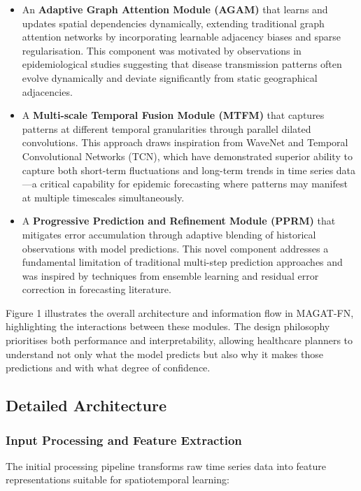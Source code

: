 \documentclass[lettersize, journal]{IEEEtran}
\begin{document}
\begin{itemize}
    \item An \textbf{Adaptive Graph Attention Module (AGAM)} that learns and updates spatial dependencies dynamically, extending traditional graph attention networks by incorporating learnable adjacency biases and sparse regularisation. This component was motivated by observations in epidemiological studies suggesting that disease transmission patterns often evolve dynamically and deviate significantly from static geographical adjacencies.
    
    \item A \textbf{Multi-scale Temporal Fusion Module (MTFM)} that captures patterns at different temporal granularities through parallel dilated convolutions. This approach draws inspiration from WaveNet and Temporal Convolutional Networks (TCN), which have demonstrated superior ability to capture both short-term fluctuations and long-term trends in time series data—a critical capability for epidemic forecasting where patterns may manifest at multiple timescales simultaneously.
    
    \item A \textbf{Progressive Prediction and Refinement Module (PPRM)} that mitigates error accumulation through adaptive blending of historical observations with model predictions. This novel component addresses a fundamental limitation of traditional multi-step prediction approaches and was inspired by techniques from ensemble learning and residual error correction in forecasting literature.
\end{itemize}

Figure 1 illustrates the overall architecture and information flow in MAGAT-FN, highlighting the interactions between these modules. The design philosophy prioritises both performance and interpretability, allowing healthcare planners to understand not only what the model predicts but also why it makes those predictions and with what degree of confidence.

\subsection{Detailed Architecture}

\subsubsection{Input Processing and Feature Extraction}
The initial processing pipeline transforms raw time series data into feature representations suitable for spatiotemporal learning:
\end{document}
